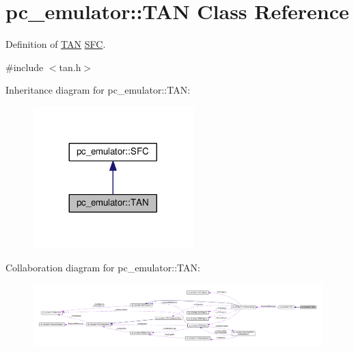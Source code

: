 \hypertarget{classpc__emulator_1_1TAN}{}\section{pc\+\_\+emulator\+:\+:T\+AN Class Reference}
\label{classpc__emulator_1_1TAN}


Definition of \hyperlink{classpc__emulator_1_1TAN}{T\+AN} \hyperlink{classpc__emulator_1_1SFC}{S\+FC}.  




{\ttfamily \#include $<$tan.\+h$>$}



Inheritance diagram for pc\+\_\+emulator\+:\+:T\+AN\+:
\nopagebreak
\begin{figure}[H]
\begin{center}
\leavevmode
\includegraphics[width=176pt]{classpc__emulator_1_1TAN__inherit__graph}
\end{center}
\end{figure}


Collaboration diagram for pc\+\_\+emulator\+:\+:T\+AN\+:
\nopagebreak
\begin{figure}[H]
\begin{center}
\leavevmode
\includegraphics[width=350pt]{classpc__emulator_1_1TAN__coll__graph}
\end{center}
\end{figure}
